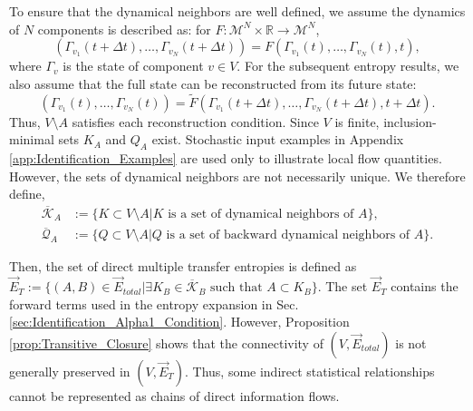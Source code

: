 \documentclass{comnet}%
\begin{document}
To ensure that the dynamical neighbors are well defined, we assume the dynamics of $N$ components is described as: for $F: \mathcal{M}^{N}\times \mathbb{R} \to \mathcal{M}^{N}$,
\begin{equation}
	(\Gamma_{v_{1}} (t + \Delta t), \dots, \Gamma_{v_{N}} (t + \Delta t)) = F(\Gamma_{v_{1}} (t), \dots, \Gamma_{v_{N}} (t), t),
	\label{eq:Deterministic_Dynamics}\end{equation}
where $\Gamma_{v}$ is the state of component $v \in V$. For the subsequent entropy results, we also assume that the full state can be reconstructed from its future state:
\begin{equation}\label{eq:Reversible_Dynamics}
 (\Gamma_{v_{1}}(t),\dots,\Gamma_{v_{N}}(t)) = \widetilde F(\Gamma_{v_{1}}(t+\Delta t),\dots,\Gamma_{v_{N}}(t+\Delta t),t+\Delta t).
\end{equation}
Thus, $V \setminus A$ satisfies each reconstruction condition. Since $V$ is finite, inclusion-minimal sets $K_A$ and $Q_A$ exist. Stochastic input examples in Appendix \ref{app:Identification_Examples} are used only to illustrate local flow quantities.\\
However, the sets of dynamical neighbors are not necessarily unique. We therefore define,
\begin{equation}
	\begin{aligned}
 \overline{\mathcal{K}}_{A} &:= \{ K \subset V \setminus A | K \text{ is a set of dynamical neighbors of } A \},\\
 \overline{\mathcal{Q}}_{A} &:= \{ Q \subset V \setminus A | Q \text{ is a set of backward dynamical neighbors of } A \}.
\end{aligned}
\end{equation}

Then, the set of direct multiple transfer entropies is defined as $\overrightarrow{E}_{T} := \{ (A, B) \in \overrightarrow{E}_{total} \allowbreak | \exists K_{B} \in \overline{\mathcal{K}}_{B} \text{\ such that\ } A \subset K_{B} \}$. The set $\overrightarrow{E}_{T}$ contains the forward terms used in the entropy expansion in Sec. \ref{sec:Identification_Alpha1_Condition}. However, Proposition \ref{prop:Transitive_Closure} shows that the connectivity of $(V, \overrightarrow{E}_{total})$ is not generally preserved in $(V, \overrightarrow{E}_{T})$. Thus, some indirect statistical relationships cannot be represented as chains of direct information flows.
\end{document}
